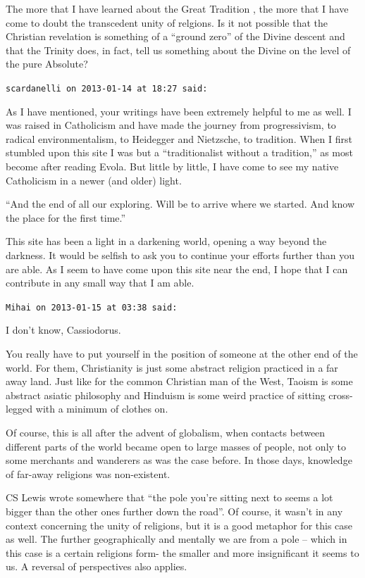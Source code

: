 \begin{footnotesize}
\begin{sffamily}
The more that I have learned about the Great Tradition , the more that I have come to doubt the transcedent unity of relgions. Is it not possible that the Christian revelation is something of a ``ground zero'' of the Divine descent and that the Trinity does, in fact, tell us something about the Divine on the level of the pure Absolute?

\hfill

\texttt{scardanelli on 2013-01-14 at 18:27 said:}

As I have mentioned, your writings have been extremely helpful to me as well. I was raised in Catholicism and have made the journey from progressivism, to radical environmentalism, to Heidegger and Nietzsche, to tradition. When I first stumbled upon this site I was but a ``traditionalist without a tradition,'' as most become after reading Evola. But little by little, I have come to see my native Catholicism in a newer (and older) light.

``And the end of all our exploring. Will be to arrive where we started. And know the place for the first time.''

This site has been a light in a darkening world, opening a way beyond the darkness. It would be selfish to ask you to continue your efforts further than you are able. As I seem to have come upon this site near the end, I hope that I can contribute in any small way that I am able.

\hfill

\texttt{Mihai on 2013-01-15 at 03:38 said:}

I don't know, Cassiodorus.

You really have to put yourself in the position of someone at the other end of the world. For them, Christianity is just some abstract religion practiced in a far away land. Just like for the common Christian man of the West, Taoism is some abstract asiatic philosophy and Hinduism is some weird practice of sitting cross-legged with a minimum of clothes on.

Of course, this is all after the advent of globalism, when contacts between different parts of the world became open to large masses of people, not only to some merchants and wanderers as was the case before. In those days, knowledge of far-away religions was non-existent.

CS Lewis wrote somewhere that ``the pole you're sitting next to seems a lot bigger than the other ones further down the road''. Of course, it wasn't in any context concerning the unity of religions, but it is a good metaphor for this case as well. The further geographically and mentally we are from a pole -- which in this case is a certain religions form- the smaller and more insignificant it seems to us. A reversal of perspectives also applies.


\end{sffamily}
\end{footnotesize}
